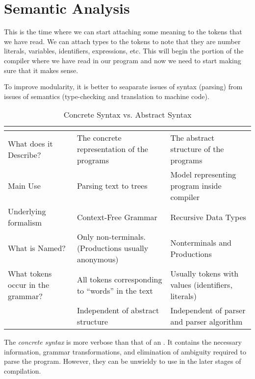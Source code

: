 \section{Semantic Analysis}\label{sec:Semantic_Analysis}
This is the time where we can start attaching some meaning to the tokens that we have read.
We can attach types to the tokens to note that they are number literals, variables, identifiers, expressions, etc.
This will begin the portion of the compiler where we have read in our program and now we need to start making sure that it makes sense.

To improve modularity, it is better to seaparate issues of syntax (parsing) from issues of semantics (type-checking and translation to machine code).

\begin{table}[h!]
  \centering
  \begin{tabular}{p{3cm}p{6cm}p{6cm}}
    \toprule
    & \multicolumn{1}{c}{\textbf{\nameref{def:Concrete_Syntax}}} & \multicolumn{1}{c}{\textbf{\nameref{def:Abstract_Syntax}}} \\
    \midrule
    What does it Describe? & The concrete representation of the programs & The abstract structure of the programs \\ \midrule
    Main Use & Parsing text to trees & Model representing program inside compiler \\ \midrule
    Underlying formalism & Context-Free Grammar & Recursive Data Types \\ \midrule
    What is Named? & Only non-terminals. (Productions usually anonymous) & Nonterminals and Productions \\ \midrule
    What tokens occur in the grammar? & All tokens corresponding to ``words'' in the text & Usually tokens with values (identifiers, literals) \\ \midrule
    & Independent of abstract structure & Independent of parser and parser algorithm \\
    \bottomrule
  \end{tabular}
  \caption{Concrete Syntax vs. Abstract Syntax}
  \label{tab:Concrete_vs_Abstract_Syntax}
\end{table}

\begin{definition}\label{def:Concrete_Syntax}
  The \emph{concrete syntax} is more verbose than that of an .
  It contains the necessary information, grammar transformations, and elimination of ambiguity required to parse the program.
  However, they can be unwieldy to use in the later stages of compilation.
\end{definition}

